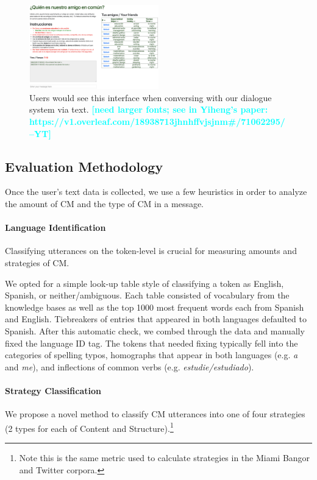 \documentclass[11pt,a4paper]{article}
\newcommand{\yt}[1]{\textcolor{cyan}{\bf\small [#1 --YT]}}
\begin{document}
\begin{figure}
    \centering
	\includegraphics[width=0.5\textwidth]{img/interface_screenshot}
  	\caption{Users would see this interface when conversing with our dialogue system via text. \yt{need larger fonts; see in Yiheng's paper: https://v1.overleaf.com/18938713jhnhffvjsjnm#/71062295/}}
    \label{fig:interface}
\end{figure}

\subsection{Evaluation Methodology}
\label{ssec:eval_method}
Once the user's text data is collected, we use a few heuristics in order to analyze the amount of CM and the type of CM in a message.

\paragraph{Language Identification}
Classifying utterances on the token-level is crucial for measuring amounts and strategies of CM.

We opted for a simple look-up table style of classifying a token as English, Spanish, or neither/ambiguous. 
Each table consisted of vocabulary from the knowledge bases as well as the top 1000 most frequent words each from Spanish and English. 
Tiebreakers of entries that appeared in both languages defaulted to Spanish. 
After this automatic check, we combed through the data and manually fixed the language ID tag. 
The tokens that needed fixing typically fell into the categories of spelling typos, homographs that appear in both languages (e.g. \textit{a} and \textit{me}), and inflections of common verbs (e.g. \textit{estudie/estudiado}).

\paragraph{Strategy Classification}
We propose a novel method to classify CM utterances into one of four strategies (2 types for each of Content and Structure).\footnote{Note this is the same metric used to calculate strategies in the Miami Bangor and Twitter corpora.}
\end{document}
